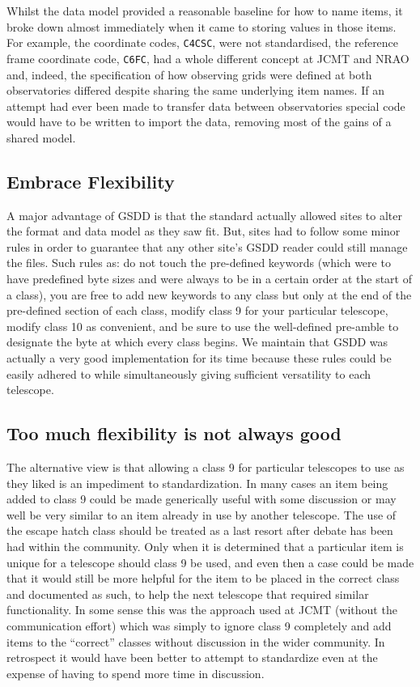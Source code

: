 \documentclass[final,authoryear,5p,times,twocolumn]{elsarticle}
\begin{document}
Whilst the data model provided a reasonable baseline for how to name
items, it broke down almost immediately when it came to storing values
in those items. For example, the coordinate codes, \texttt{C4CSC},
were not standardised, the reference frame coordinate code,
\texttt{C6FC}, had a whole different concept at JCMT and NRAO and,
indeed, the specification of how observing grids were defined at both
observatories differed despite sharing the same underlying item
names. If an attempt had ever been made to transfer data between
observatories special code would have to be written to import the
data, removing most of the gains of a shared model.

\subsection{Embrace Flexibility}

A major advantage of GSDD is that the standard actually allowed sites
to alter the format and data model as they saw fit.  But, sites had to
follow some minor rules in order to guarantee that any other site's
GSDD reader could still manage the files.  Such rules as: do not touch
the pre-defined keywords (which were to have predefined byte sizes and
were always to be in a certain order at the start of a class), you are
free to add new keywords to any class but only at the end of the
pre-defined section of each class, modify class 9 for your particular
telescope, modify class 10 as convenient, and be sure to
use the well-defined pre-amble to designate the byte at which every
class begins.  We maintain that GSDD was actually a very good
implementation for its time because these rules could be easily
adhered to while simultaneously giving sufficient versatility to each
telescope.

\subsection{Too much flexibility is not always good}

The alternative view is that allowing a class 9 for particular
telescopes to use as they liked is an impediment to
standardization. In many cases an item being added to class 9 could be
made generically useful with some discussion or may well be very
similar to an item already in use by another telescope. The use of the
escape hatch class should be treated as a last resort after debate has
been had within the community. Only when it is determined that a
particular item is unique for a telescope should class 9 be used, and
even then a case could be made that it would still be more helpful for
the item to be placed in the correct class and documented as such, to
help the next telescope that required similar functionality. In some
sense this was the approach used at JCMT (without the communication
effort) which was simply to ignore class 9 completely and add items to
the ``correct'' classes without discussion in the wider community. In
retrospect it would have been better to attempt to standardize even at
the expense of having to spend more time in discussion.
\end{document}
